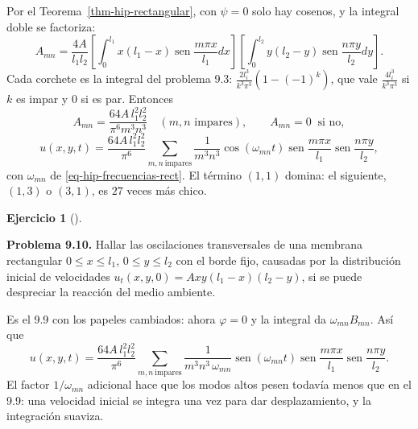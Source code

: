 \documentclass[
  spanish,
  a4paper,
]{scrbook}
\theoremstyle{definition}
\theoremstyle{plain}
\theoremstyle{definition}
\theoremstyle{plain}
\theoremstyle{definition}
\newtheorem{exercise}{Ejercicio}[chapter]
\theoremstyle{remark}
\begin{document}
\begin{tcolorbox}[enhanced jigsaw, arc=.35mm, bottomrule=.15mm, bottomtitle=1mm, breakable, colback=white, colbacktitle=quarto-callout-tip-color!10!white, colframe=quarto-callout-tip-color-frame, coltitle=black, left=2mm, leftrule=.75mm, opacityback=0, opacitybacktitle=0.6, rightrule=.15mm, title=\textcolor{quarto-callout-tip-color}{\faLightbulb}\hspace{0.5em}{Solución}, titlerule=0mm, toprule=.15mm, toptitle=1mm]

Por el Teorema~\ref{thm-hip-rectangular}, con \(\psi = 0\) solo hay
cosenos, y la integral doble se factoriza: \[
A_{mn} = \frac{4A}{l_1l_2}\left[\int_0^{l_1}x(l_1-x)\operatorname{sen}\frac{m\pi x}{l_1}dx\right]\left[\int_0^{l_2}y(l_2-y)\operatorname{sen}\frac{n\pi y}{l_2}dy\right].
\] Cada corchete es la integral del problema 9.3:
\(\frac{2l_i^3}{k^3\pi^3}(1-(-1)^k)\), que vale
\(\frac{4l_i^3}{k^3\pi^3}\) si \(k\) es impar y \(0\) si es par.
Entonces \[
A_{mn} = \frac{64A\,l_1^2l_2^2}{\pi^6m^3n^3}\quad (m,n\text{ impares}),\qquad A_{mn} = 0\ \text{ si no},
\] \[
u(x,y,t) = \frac{64A\,l_1^2l_2^2}{\pi^6}\sum_{m,n\ \text{impares}}\frac{1}{m^3n^3}\cos(\omega_{mn}t)\operatorname{sen}\frac{m\pi x}{l_1}\operatorname{sen}\frac{n\pi y}{l_2},
\] con \(\omega_{mn}\) de \ref{eq-hip-frecuencias-rect}. El término
\((1,1)\) domina: el siguiente, \((1,3)\) o \((3,1)\), es \(27\) veces
más chico.

\end{tcolorbox}

\begin{exercise}[]\protect\hypertarget{exr-hip-p10}{}\label{exr-hip-p10}

\textbf{Problema 9.10.} Hallar las oscilaciones transversales de una
membrana rectangular \(0\le x\le l_1\), \(0\le y\le l_2\) con el borde
fijo, causadas por la distribución inicial de velocidades
\(u_t(x,y,0) = Axy(l_1-x)(l_2-y)\), si se puede despreciar la reacción
del medio ambiente.

\end{exercise}

\begin{tcolorbox}[enhanced jigsaw, arc=.35mm, bottomrule=.15mm, bottomtitle=1mm, breakable, colback=white, colbacktitle=quarto-callout-tip-color!10!white, colframe=quarto-callout-tip-color-frame, coltitle=black, left=2mm, leftrule=.75mm, opacityback=0, opacitybacktitle=0.6, rightrule=.15mm, title=\textcolor{quarto-callout-tip-color}{\faLightbulb}\hspace{0.5em}{Solución}, titlerule=0mm, toprule=.15mm, toptitle=1mm]

Es el 9.9 con los papeles cambiados: ahora \(\varphi = 0\) y la integral
da \(\omega_{mn}B_{mn}\). Así que \[
u(x,y,t) = \frac{64A\,l_1^2l_2^2}{\pi^6}\sum_{m,n\ \text{impares}}\frac{1}{m^3n^3\,\omega_{mn}}\operatorname{sen}(\omega_{mn}t)\operatorname{sen}\frac{m\pi x}{l_1}\operatorname{sen}\frac{n\pi y}{l_2}.
\] El factor \(1/\omega_{mn}\) adicional hace que los modos altos pesen
todavía menos que en el 9.9: una velocidad inicial se integra una vez
para dar desplazamiento, y la integración suaviza.

\end{tcolorbox}
\end{document}
